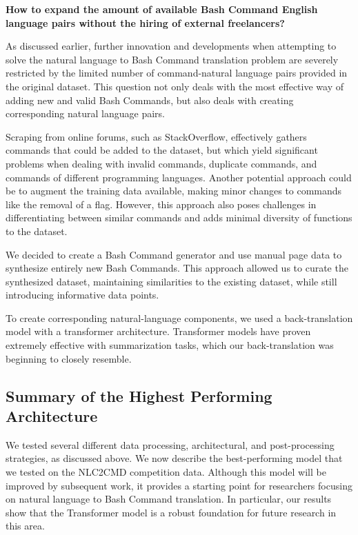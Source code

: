 \documentclass{river-journal}
\begin{document}
\textbf{How to expand the amount of available Bash Command English language pairs without the hiring of external freelancers?} 

As discussed earlier, further innovation and developments when attempting to solve the natural language to Bash Command translation problem are severely restricted by the limited number of command-natural language pairs provided in the original dataset. This question not only deals with the most effective way of adding new and valid Bash Commands, but also deals with creating corresponding natural language pairs.

Scraping from online forums, such as StackOverflow, effectively gathers commands that could be added to the dataset, but which yield significant problems when dealing with invalid commands, duplicate commands, and commands of different programming languages. Another potential approach could be to augment the training data available, making minor changes to commands like the removal of a flag. However, this approach also poses challenges in differentiating between similar commands and adds minimal diversity of functions to the dataset.

We decided to create a Bash Command generator and use manual page data to synthesize entirely new Bash Commands. This approach allowed us to curate the synthesized dataset, maintaining similarities to the existing dataset, while still introducing informative data points.

To create corresponding natural-language components, we used a back-translation model with a transformer architecture. Transformer models have proven extremely effective with summarization tasks, which our back-translation was beginning to closely resemble.

\subsection{Summary of the Highest Performing Architecture} 
\label{arch.summary}

We tested several different data processing, architectural, and post-processing strategies, as discussed above. We now describe the best-performing model that we tested on the NLC2CMD competition data. Although this model will be improved by subsequent work, it provides a starting point for researchers focusing on natural language to Bash Command translation. In particular, our results show that the Transformer model is a robust foundation for future research in this area. 
\end{document}
